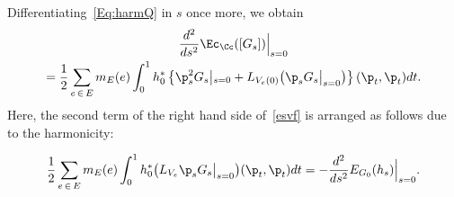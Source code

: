 Differentiating~\eqref{Eq:harmQ} in $s$ once more, we obtain
\begin{multline}\label{esvf}
\frac{d^2}{d s^2}\Ec_{\Cc}([G_{s}])\Big{|}_{s=0}\\
=\frac{1}{2}\sum_{e\,\in\,E}m_E(e)\int_{0}^1h_0^*\left\{{\p_s^2}G_{s}\middle|_{s=0}+L_{V_e(0)}\big({\p_s}G_{s}\big|_{s=0}\big)\right\}(\p_{t},\p_{t})dt.
\end{multline}
Here, the second term of the right hand side of~\eqref{esvf} is arranged as follows due to the harmonicity:



\begin{lemm}
\begin{equation}\label{harm3}
\frac{1}{2}\sum_{e\,\in\,E}m_E(e)\int_{0}^1 h_0^*\big(L_{V_e}{\p_s}G_{s}\big|_{s=0}\big)(\p_{t},\p_{t})dt=-\frac{d^2}{d s^2}E_{G_{0}}(h_{s})\Big{|}_{s=0}.
\end{equation}
\end{lemm}



